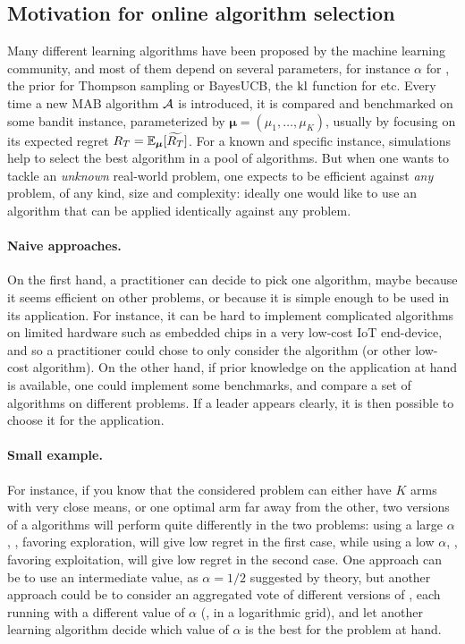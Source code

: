 \subsection{Motivation for online algorithm selection}\label{sub:25:introduction}

Many different learning algorithms have been proposed by the machine learning community,
and most of them depend on several parameters, for instance $\alpha$ for \UCB, the prior for Thompson sampling or BayesUCB,
the $\mathrm{kl}$ function for \klUCB{} etc.
Every time a new MAB algorithm $\mathcal{A}$ is introduced, it is compared and benchmarked on some bandit instance, parameterized by $\boldsymbol{\mu} = (\mu_1,\dots,\mu_K)$, usually by focusing on its expected regret $R_T = \mathbb{E}_{\boldsymbol{\mu}}[\widetilde{R_T}]$.
%
For a known and specific instance, simulations help to select the best algorithm in a pool of algorithms.
But when one wants to tackle an \emph{unknown} real-world problem, one expects to be efficient against \emph{any} problem, of any kind, size and complexity:
ideally one would like to use an algorithm that can be applied identically against any problem.

\paragraph{Naive approaches.}
%
On the first hand, a practitioner can decide to pick one algorithm, maybe because it seems efficient on other problems, or because it is simple enough to be used in its application. For instance, it can be hard to implement complicated algorithms on limited hardware such as embedded chips in a very low-cost IoT end-device, and so a practitioner could chose to only consider the \UCB{} algorithm (or other low-cost algorithm).
%
On the other hand, if prior knowledge on the application at hand is available, one could implement some benchmarks, and compare a set of algorithms on different problems. If a leader appears clearly, it is then possible to choose it for the application.


\paragraph{Small example.}
%
For instance, if you know that the considered problem can either have $K$ arms with very close means, or one optimal arm far away from the other, two versions of a \UCB{} algorithms will perform quite differently in the two problems:
using a large $\alpha$, \ie, favoring exploration, will give low regret in the first case,
while using a low $\alpha$, \ie, favoring exploitation, will give low regret in the second case.
One approach can be to use an intermediate value, as $\alpha=1/2$ suggested by theory, but another approach could be to consider an aggregated vote of different versions of \UCB, each running with a different value of $\alpha$ (\eg, in a logarithmic grid), and let another learning algorithm decide which value of $\alpha$ is the best for the problem at hand.


